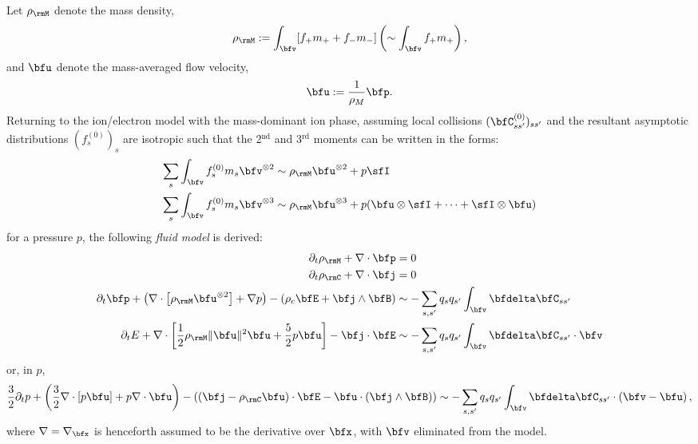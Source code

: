     Let $\rho_{\rmM}$ denote the mass density,
    \begin{equation}
        \rho_{\rmM}  :=  \int_{\bfv}[f_{+}m_{+} + f_{-}m_{-}]  \left(\sim  \int_{\bfv}f_{+}m_{+}\right),
    \end{equation}
    and $\bfu$ denote the mass-averaged flow velocity,
    \begin{equation}
        \bfu  :=  \frac{1}{\rho_{M}}\bfp.
    \end{equation}
    Returning to the ion/electron model with the mass-dominant ion phase, assuming local collisions $(\bfC_{ss'}^{(0)})_{ss'}$ and the resultant asymptotic distributions $(f_{s}^{(0)})_{s}$ are isotropic such that the 2$^{\text{nd}}$ and 3$^{\text{rd}}$ moments can be written in the forms:
    \begin{align}
        \sum_{s}\int_{\bfv}f_{s}^{(0)}m_{s}\bfv^{\otimes 2}  &\sim  \rho_{\rmM}\bfu^{\otimes 2} + p\sfI  \\
        \sum_{s}\int_{\bfv}f_{s}^{(0)}m_{s}\bfv^{\otimes 3}  &\sim  \rho_{\rmM}\bfu^{\otimes 3} + p(\bfu\otimes\sfI + \cdots + \sfI\otimes\bfu)
    \end{align}
    for a pressure $p$, the following \emph{fluid model} is derived:
    \begin{align}
        \partial_{t}\rho_{\rmM} + \nabla\cdot\bfp  &=  0  \\
        \partial_{t}\rho_{\rmC} + \nabla\cdot\bfj  &=  0  \\
        \partial_{t}\bfp + \left(\nabla\cdot\left[\rho_{\rmM}\bfu^{\otimes 2}\right] + \nabla p\right) - \left(\rho_{c}\bfE + \bfj\wedge\bfB\right)  &\sim  - \sum_{s, s'}q_{s}q_{s'}\int_{\bfv}\bfdelta\bfC_{ss'}  \\
        \partial_{t}E + \nabla\cdot\left[\frac{1}{2}\rho_{\rmM}\|\bfu\|^{2}\bfu + \frac{5}{2}p\bfu\right] - \bfj\cdot\bfE  &\sim  - \sum_{s, s'}q_{s}q_{s'}\int_{\bfv}\bfdelta\bfC_{ss'}\cdot\bfv
    \end{align}
    or, in $p$,
    \begin{equation}
        \frac{3}{2}\partial_{t}p + \left(\frac{3}{2}\nabla\cdot[p\bfu] + p\nabla\cdot\bfu\right) - ((\bfj - \rho_{\rmC}\bfu)\cdot\bfE - \bfu\cdot(\bfj\wedge\bfB))  \sim  - \sum_{s, s'}q_{s}q_{s'}\int_{\bfv}\bfdelta\bfC_{ss'}\cdot\left(\bfv - \bfu\right),
    \end{equation}
    where $\nabla  =  \nabla_{\bfx}$ is henceforth assumed to be the derivative over $\bfx$, with $\bfv$ eliminated from the model.

    \line

